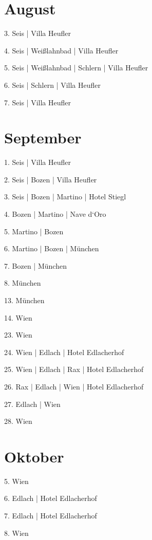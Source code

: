 \documentclass[twoside=false,titlepage=false,open=any, parskip=never, fontsize=10pt, headings=small, chapterprefix=false, appendixprefix=false, DIV=15]{scrbook}
\begin{document}
\begin{multicols}{3}
            \section*{August}
            3. Seis | Villa Heufler\par
            4. Seis | Weißlahnbad | Villa Heufler\par
            5. Seis | Weißlahnbad | Schlern | Villa Heufler\par
            6. Seis | Schlern | Villa Heufler\par
            7. Seis | Villa Heufler\par
            \section*{September}
            1. Seis | Villa Heufler\par
            2. Seis | Bozen | Villa Heufler\par
            3. Seis | Bozen | Martino | Hotel Stiegl\par
            4. Bozen | Martino | Nave d‘Oro\par
            5. Martino | Bozen\par
            6. Martino | Bozen | München\par
            7. Bozen | München\par
            8. München\par
            13. München\par
            14. Wien\par
            23. Wien\par
            24. Wien | Edlach | Hotel Edlacherhof\par
            25. Wien | Edlach | Rax | Hotel Edlacherhof\par
            26. Rax | Edlach | Wien | Hotel Edlacherhof\par
            27. Edlach | Wien\par
            28. Wien\par
            \section*{Oktober}
            5. Wien\par
            6. Edlach | Hotel Edlacherhof\par
            7. Edlach | Hotel Edlacherhof\par
            8. Wien\par

\end{multicols}
\end{document}
